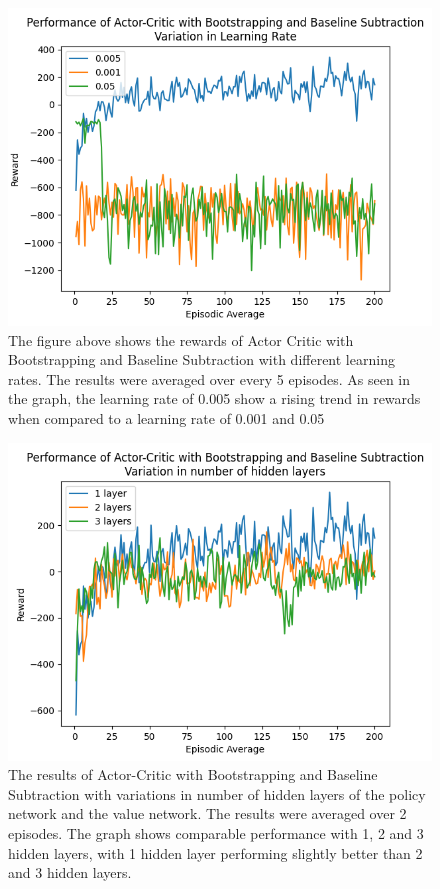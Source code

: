 \documentclass{article}
\begin{document}
\begin{figure}[h!]
\centering
\includegraphics[width=0.85\linewidth]{Report/images/10.Performance_of_Actor_Critic_BSandBS_LR.png}
\caption{\label{fig:ActorCriticBS2-different learning rates}The figure above shows the rewards of Actor Critic with Bootstrapping and Baseline Subtraction with different learning rates. The results were averaged over every 5 episodes. As seen in the graph, the learning rate of 0.005 show a rising trend in rewards when compared to a learning rate of 0.001 and 0.05}
\end{figure}

\begin{figure}[h!]
\centering
\includegraphics[width=0.85\linewidth]{Report/images/11.Performance_of_Actor_Critic_BSandBS_Layers.png}
\caption{\label{fig:ActorCriticBS2-different neurons}The results of Actor-Critic with Bootstrapping and Baseline Subtraction with variations in number of hidden layers of the policy network and the value network. The results were averaged over 2 episodes. The graph shows comparable performance with 1, 2 and 3 hidden layers, with 1 hidden layer performing slightly better than 2 and 3 hidden layers. }
\end{figure}
\end{document}
